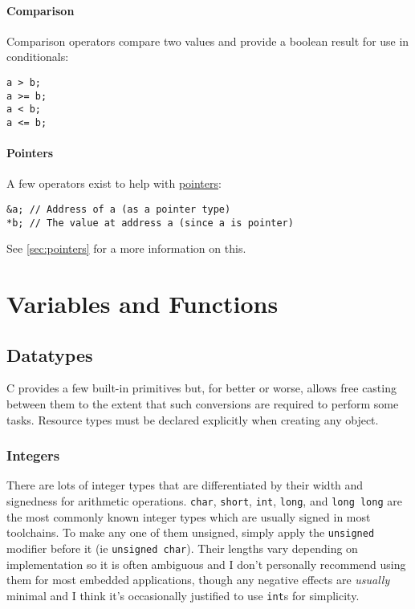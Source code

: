 \documentclass[10pt]{article}
\begin{document}
\paragraph{Comparison}
Comparison operators compare two values and provide a boolean result for use in conditionals:
\begin{lstlisting}[]
a > b;
a >= b;
a < b;
a <= b;
\end{lstlisting}

\paragraph{Pointers}
A few operators exist to help with \hyperref[sec:pointers]{pointers}:
\begin{lstlisting}[]
&a; // Address of a (as a pointer type)
*b; // The value at address a (since a is pointer)
\end{lstlisting}
See \autoref{sec:pointers} for a more information on this.

\section{Variables and Functions}

\subsection{Datatypes}

C provides a few built-in primitives but, for better or worse, allows free casting between them to the extent that such conversions are required to perform some tasks. Resource types must be declared explicitly when creating any object.

\subsubsection{Integers}

There are lots of integer types that are differentiated by their width and signedness for arithmetic operations. \texttt{char}, \texttt{short}, \texttt{int}, \texttt{long}, and \texttt{long long} are the most commonly known integer types which are usually signed in most toolchains. To make any one of them unsigned, simply apply the \texttt{unsigned} modifier before it (ie \texttt{unsigned char}).  Their lengths vary depending on implementation so it is often ambiguous and I don't personally recommend using them for most embedded applications, though any negative effects are \textit{usually} minimal and I think it's occasionally justified to use \texttt{int}s for simplicity. \\
\end{document}
